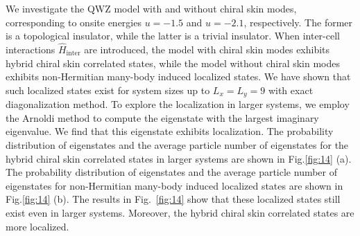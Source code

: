 \documentclass[longbibliography, aps, prx, amsmath, amssymb, amsfonts, twocolumn,superscriptaddress, footinbib]{revtex4-1}
\begin{document}
	We investigate the QWZ model with and without chiral skin modes, corresponding to onsite energies $u=-1.5$ and $u=-2.1$, respectively. The former is a topological insulator, while the latter is a trivial insulator. When inter-cell interactions $\hat{H}_{\text{inter}}$ are introduced, the model with chiral skin modes exhibits hybrid chiral skin correlated states, while the model without chiral skin modes exhibits non-Hermitian many-body induced localized states.
	We have shown that such localized states exist for system sizes up to $L_x = L_y = 9$ with exact diagonalization method. To explore the localization in larger systems, we employ the Arnoldi method to compute the eigenstate with the largest imaginary eigenvalue. 
	We find that this eigenstate exhibits localization.
	The probability distribution of eigenstates and the average particle number of eigenstates for the hybrid chiral skin correlated states in larger systems are shown in Fig.\ref{fig:14} (a). 
	The probability distribution of eigenstates and the average particle number of eigenstates for non-Hermitian many-body induced localized states are shown in Fig.\ref{fig:14} (b). The results in Fig.~\ref{fig:14} show that these localized states still exist even in larger systems. Moreover, the hybrid chiral skin correlated states are more localized.

\end{document}
